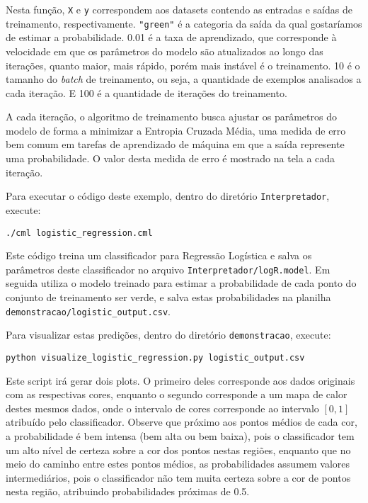 \documentclass[12pt]{article}
\begin{document}
Nesta função, \texttt{X} e \texttt{y} correspondem aos datasets contendo as entradas e saídas de treinamento, respectivamente. \texttt{"green"} é a categoria da saída da qual gostaríamos de estimar a probabilidade. 0.01 é a taxa de aprendizado, que corresponde à velocidade em que os parâmetros do modelo são atualizados ao longo das iterações, quanto maior, mais rápido, porém mais instável é o treinamento. 10 é o tamanho do \textit{batch} de treinamento, ou seja, a quantidade de exemplos analisados a cada iteração. E 100 é a quantidade de iterações do treinamento.

A cada iteração, o algoritmo de treinamento busca ajustar os parâmetros do modelo de forma a minimizar a Entropia Cruzada Média, uma medida de erro bem comum em tarefas de aprendizado de máquina em que a saída represente uma probabilidade. O valor desta medida de erro é mostrado na tela a cada iteração.

Para executar o código deste exemplo, dentro do diretório \texttt{Interpretador}, execute:

\begin{verbatim}
./cml logistic_regression.cml
\end{verbatim}

Este código treina um classificador para Regressão Logística e salva os parâmetros deste classificador no arquivo \texttt{Interpretador/logR.model}. Em seguida utiliza o modelo treinado para estimar a probabilidade de cada ponto do conjunto de treinamento ser verde, e salva estas probabilidades na planilha \texttt{demonstracao/logistic\_output.csv}.

Para visualizar estas predições, dentro do diretório \texttt{demonstracao}, execute:

\begin{verbatim}
python visualize_logistic_regression.py logistic_output.csv
\end{verbatim}

Este script irá gerar dois plots. O primeiro deles corresponde aos dados originais com as respectivas cores, enquanto o segundo corresponde a um mapa de calor destes mesmos dados, onde o intervalo de cores corresponde ao intervalo $[0,1]$ atribuído pelo classificador. Observe que próximo aos pontos médios de cada cor, a probabilidade é bem intensa (bem alta ou bem baixa), pois o classificador tem um alto nível de certeza sobre a cor dos pontos nestas regiões, enquanto que no meio do caminho entre estes pontos médios, as probabilidades assumem valores intermediários, pois o classificador não tem muita certeza sobre a cor de pontos nesta região, atribuindo probabilidades próximas de 0.5.
\end{document}
